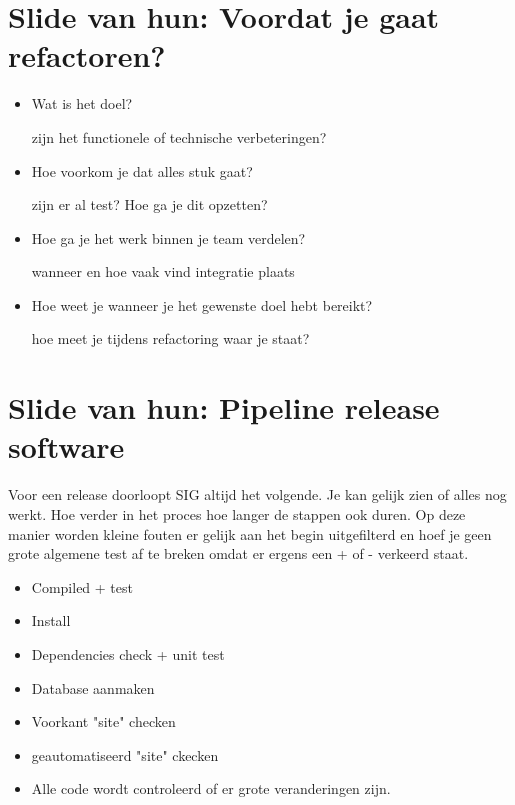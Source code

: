 \documentclass{article}
\begin{document}
\section{Slide van hun: Voordat je gaat refactoren?} 
\begin{itemize}
	\item Wat is het doel? 
	
	zijn het functionele of technische verbeteringen? 
	\item Hoe voorkom je dat alles stuk gaat?
	
	zijn er al test? Hoe ga je dit opzetten? 
	\item Hoe ga je het werk binnen je team verdelen?
	
	wanneer en hoe vaak vind integratie plaats
	\item Hoe weet je wanneer je het gewenste doel hebt bereikt? 
	
	hoe meet je tijdens refactoring waar je staat? 
\end{itemize}
\section{Slide van hun: Pipeline release software}
Voor een release doorloopt SIG altijd het volgende. Je kan gelijk zien of alles nog werkt. Hoe verder in het proces hoe langer de stappen ook duren. Op deze manier worden kleine fouten er gelijk aan het begin uitgefilterd en hoef je geen grote algemene test af te breken omdat er ergens een + of - verkeerd staat. 
	\begin{itemize}
		\item Compiled + test
		\item Install
		\item Dependencies check + unit test
		\item Database aanmaken
		\item Voorkant "site" checken
		\item geautomatiseerd "site" ckecken
		\item Alle code wordt controleerd of er grote veranderingen zijn. 
	\end{itemize}
\end{document}
